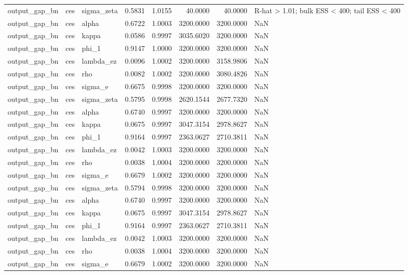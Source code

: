 \begin{tabular}{lllrrrrl}
output\_gap\_bn & ces & sigma\_zeta & 0.5831 & 1.0155 & 40.0000 & 40.0000 & R-hat > 1.01; bulk ESS < 400; tail ESS < 400 \\
output\_gap\_bn & ces & alpha & 0.6722 & 1.0003 & 3200.0000 & 3200.0000 & NaN \\
output\_gap\_bn & ces & kappa & 0.0586 & 0.9997 & 3035.6020 & 3200.0000 & NaN \\
output\_gap\_bn & ces & phi\_1 & 0.9147 & 1.0000 & 3200.0000 & 3200.0000 & NaN \\
output\_gap\_bn & ces & lambda\_ez & 0.0096 & 1.0002 & 3200.0000 & 3158.9806 & NaN \\
output\_gap\_bn & ces & rho & 0.0082 & 1.0002 & 3200.0000 & 3080.4826 & NaN \\
output\_gap\_bn & ces & sigma\_e & 0.6675 & 0.9998 & 3200.0000 & 3200.0000 & NaN \\
output\_gap\_bn & ces & sigma\_zeta & 0.5795 & 0.9998 & 2620.1544 & 2677.7320 & NaN \\
output\_gap\_bn & ces & alpha & 0.6740 & 0.9997 & 3200.0000 & 3200.0000 & NaN \\
output\_gap\_bn & ces & kappa & 0.0675 & 0.9997 & 3047.3154 & 2978.8627 & NaN \\
output\_gap\_bn & ces & phi\_1 & 0.9164 & 0.9997 & 2363.0627 & 2710.3811 & NaN \\
output\_gap\_bn & ces & lambda\_ez & 0.0042 & 1.0003 & 3200.0000 & 3200.0000 & NaN \\
output\_gap\_bn & ces & rho & 0.0038 & 1.0004 & 3200.0000 & 3200.0000 & NaN \\
output\_gap\_bn & ces & sigma\_e & 0.6679 & 1.0002 & 3200.0000 & 3200.0000 & NaN \\
output\_gap\_bn & ces & sigma\_zeta & 0.5794 & 0.9998 & 3200.0000 & 3200.0000 & NaN \\
output\_gap\_bn & ces & alpha & 0.6740 & 0.9997 & 3200.0000 & 3200.0000 & NaN \\
output\_gap\_bn & ces & kappa & 0.0675 & 0.9997 & 3047.3154 & 2978.8627 & NaN \\
output\_gap\_bn & ces & phi\_1 & 0.9164 & 0.9997 & 2363.0627 & 2710.3811 & NaN \\
output\_gap\_bn & ces & lambda\_ez & 0.0042 & 1.0003 & 3200.0000 & 3200.0000 & NaN \\
output\_gap\_bn & ces & rho & 0.0038 & 1.0004 & 3200.0000 & 3200.0000 & NaN \\
output\_gap\_bn & ces & sigma\_e & 0.6679 & 1.0002 & 3200.0000 & 3200.0000 & NaN \\

\end{tabular}

